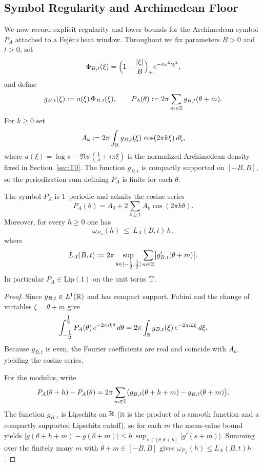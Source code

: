 
\subsection{Symbol Regularity and Archimedean Floor}\label{subsec:a3-symbol-floor}
We now record explicit regularity and lower bounds for the Archimedean symbol $P_A$ attached to a Fej\'er$\times$heat window. Throughout we fix parameters $B>0$ and $t>0$, set
\[
  \Phi_{B,t}(\xi) = \Bigl(1-\frac{|\xi|}{B}\Bigr)_{+} e^{-4\pi^2 t \xi^2},
\]
and define
\[
  g_{B,t}(\xi) := a(\xi)\,\Phi_{B,t}(\xi),\qquad
  P_A(\theta) := 2\pi\sum_{m\in\mathbb Z} g_{B,t}(\theta+m).
\]
For $k\ge 0$ set
\[
  A_k := 2\pi\int_{\mathbb R} g_{B,t}(\xi)\,\cos(2\pi k\xi)\,d\xi,
\]
where $a(\xi)=\log\pi - \Re\psi(\tfrac14+i\pi\xi)$ is the normalized Archimedean density fixed in Section~\ref{sec:T0}. The function $g_{B,t}$ is compactly supported on $[-B,B]$, so the periodization sum defining $P_A$ is finite for each $\theta$.

\begin{lemma}\label{lem:a3-lipschitz-bound}
The symbol $P_A$ is $1$--periodic and admits the cosine series
\[
  P_A(\theta)=A_0+2\sum_{k\ge1}A_k\cos(2\pi k\theta).
\]
Moreover, for every $h\ge 0$ one has
\[
  \omega_{P_A}(h)\ \le\ L_A(B,t)\,h,
\]
where
\[
  L_A(B,t)
  := 2\pi\sup_{\theta\in[-\tfrac12,\tfrac12]}\sum_{m\in\mathbb Z}\bigl|g_{B,t}'(\theta+m)\bigr|.
\]
In particular $P_A\in \mathrm{Lip}(1)$ on the unit torus $\mathbb T$.
\end{lemma}

\begin{proof}
Since $g_{B,t}\in L^1(\mathbb R)$ and has compact support, Fubini and the change of variables $\xi=\theta+m$ give
\[
  \int_{-\tfrac12}^{\tfrac12} P_A(\theta)\,e^{-2\pi i k\theta}\,d\theta
  = 2\pi\int_{\mathbb R} g_{B,t}(\xi)\,e^{-2\pi i k\xi}\,d\xi.
\]
Because $g_{B,t}$ is even, the Fourier coefficients are real and coincide with $A_k$, yielding the cosine series.

For the modulus, write
\[
  P_A(\theta+h)-P_A(\theta)
  = 2\pi\sum_{m\in\mathbb Z}\bigl(g_{B,t}(\theta+h+m)-g_{B,t}(\theta+m)\bigr).
\]
The function $g_{B,t}$ is Lipschitz on $\mathbb R$ (it is the product of a smooth function and a compactly supported Lipschitz cutoff), so for each $m$ the mean-value bound yields
\(
|g(\theta+h+m)-g(\theta+m)| \le h\,\sup_{s\in[\theta,\theta+h]}|g'(s+m)|.
\)
Summing over the finitely many $m$ with $\theta+m\in[-B,B]$ gives
$\omega_{P_A}(h)\le L_A(B,t)h$.
\end{proof}

